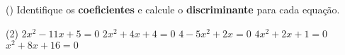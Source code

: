 \begin{question}[type=exam] () %
 Identifique os \textbf{coeficientes} e calcule o \textbf{discriminante} para cada equação.
\begin{tasks}(2)
        \task $2x^2-11x+5=0$
        \task $2x^2+4x+4=0$
        \task $4-5x^2+2x=0$
        \task $4x^2+2x+1=0$
        \task $x^2+8x+16=0$
    \end{tasks}
\end{question}